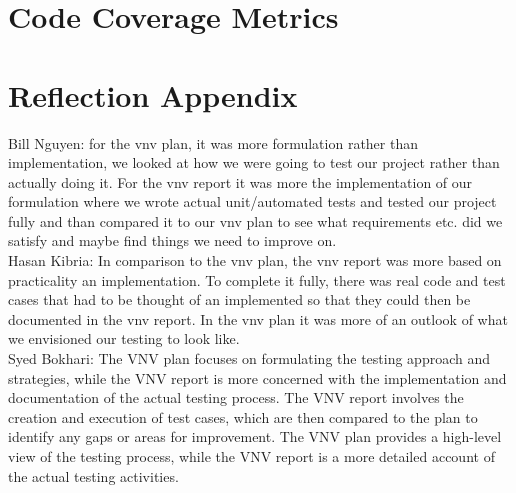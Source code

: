\documentclass[12pt, titlepage]{article}
\begin{document}
\section{Code Coverage Metrics}

\section{Reflection Appendix}
Bill Nguyen: for the vnv plan, it was more formulation rather than implementation, we looked at how we were going to test our project rather than actually doing it. For the vnv report it 
was more the implementation of our formulation where we wrote actual unit/automated tests and tested our project fully and than compared it to our vnv plan to see what requirements etc. did we satisfy and maybe find things we need to improve on.\\

Hasan Kibria: In comparison to the vnv plan, the vnv report was more based on practicality an implementation. To complete it fully, there was real code and test cases that had to be thought of an implemented so that they could then be documented in the vnv report. In the vnv plan it was more of an outlook of what we envisioned our testing to look like.\\

Syed Bokhari: The VNV plan focuses on formulating the testing approach and strategies, while the VNV report is more concerned with the implementation and documentation of the actual testing process. The VNV report involves the creation and execution of test cases, which are then compared to the plan to identify any gaps or areas for improvement. The VNV plan provides a high-level view of the testing process, while the VNV report is a more detailed account of the actual testing activities.
\\



\end{document}
